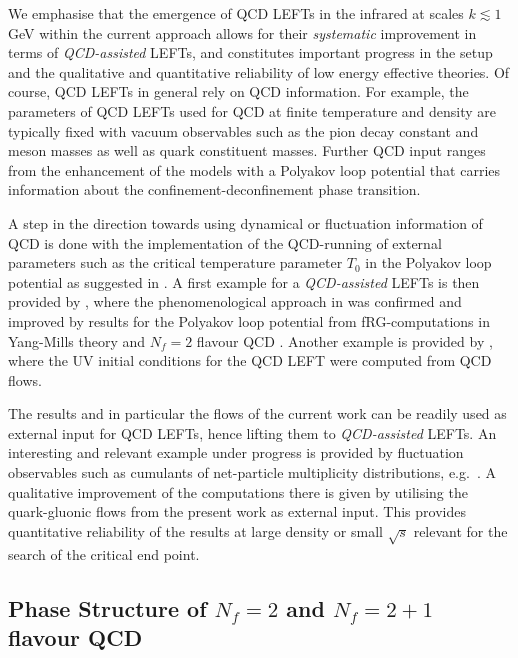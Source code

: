 \documentclass[%
reprint,
superscriptaddress,
showpacs,preprintnumbers,
 amsmath,amssymb,
 aps,
prd,
]{revtex4-1}
\begin{document}
We emphasise that the emergence of QCD LEFTs in the infrared at scales
$k\lesssim 1$\,GeV within the current approach allows for their
\textit{systematic} improvement in terms of \textit{QCD-assisted}
LEFTs, and constitutes important progress in the setup and the
qualitative and quantitative reliability of low energy effective
theories.  Of course, QCD LEFTs in general rely on QCD
information. For example, the parameters of QCD LEFTs used for QCD at
finite temperature and density are typically fixed with vacuum
observables such as the pion decay constant and meson masses as well
as quark constituent masses. Further QCD input ranges from the
enhancement of the models with a Polyakov loop potential that carries
information about the confinement-deconfinement phase transition.

A step in the direction towards using dynamical or fluctuation
information of QCD is done with the implementation of the QCD-running
of external parameters such as the critical temperature parameter
$T_0$ in the Polyakov loop potential as suggested in
\cite{Schaefer:2007pw}. A first example for a \textit{QCD-assisted}
LEFTs is then provided by \cite{Haas:2013qwp,Herbst:2013ufa}, where
the phenomenological approach in \cite{Schaefer:2007pw} was confirmed
and improved by results for the Polyakov loop potential from
fRG-computations in Yang-Mills theory
\cite{Braun:2007bx,Fister:2013bh} and $N_f=2$ flavour QCD
\cite{Braun:2009gm}. Another example is provided by
\cite{Springer:2016cji}, where the UV initial conditions for the QCD
LEFT were computed from QCD flows. 

The results and in particular the flows of the current work can be
readily used as external input for QCD LEFTs, hence lifting them to
\textit{QCD-assisted} LEFTs. An interesting and relevant example under
progress is provided by fluctuation observables such as cumulants of
net-particle multiplicity distributions, e.g.\
\cite{Fu:2016tey,Fu:2018swz}. A qualitative improvement of the
computations there is given by utilising the quark-gluonic flows from
the present work as external input. This provides quantitative
reliability of the results at large density or small $\sqrt{s}$
relevant for the search of the critical end point.

    





\subsection{Phase Structure of $N_f=2$ and $N_f=2+1$ flavour
  QCD}\label{sec:PhaseStructure}
\end{document}

